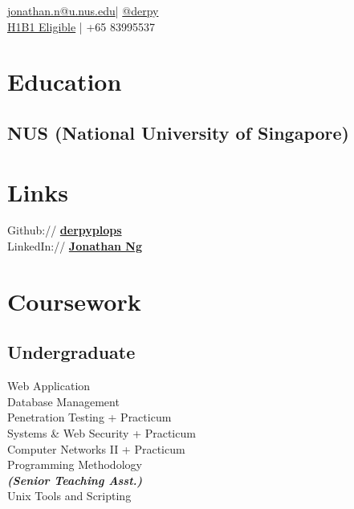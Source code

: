 \documentclass[]{deedy-resume-openfont}
\begin{document}
%
%
\lastupdated

%
%
 { \href{mailto:jonathan.n@u.nus.edu}{jonathan.n@u.nus.edu}| \href{http://t.me/derpy/}{@derpy}\\
\href{http://www.h1b1.com/practices/h-1b1-visa-for-chileans-singaporeans/}{H1B1 Eligible}
| +65 83995537
\\
}

%
%

\begin{minipage}[t]{0.29\textwidth}


\section{Education} 

\subsection{NUS (National University of Singapore)}
\sectionsep


\section{Links} 
Github:// \href{https://github.com/derpyplops}{\bf derpyplops} \\
LinkedIn://  \href{https://www.linkedin.com/in/jonathan-ng-7061a3162/}{\bf Jonathan Ng} \\


\section{Coursework}

\subsection{Undergraduate}
Web Application \\
Database Management \\
Penetration Testing + Practicum \\
Systems \& Web Security + Practicum \\
Computer Networks II + Practicum \\
Programming Methodology \\
{\footnotesize \textit{\textbf{(Senior Teaching Asst.) }}} \\
Unix Tools and Scripting \\
\sectionsep


\end{minipage}
\end{document}
